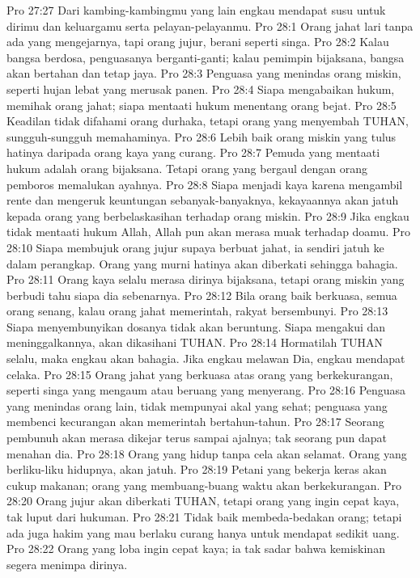 Pro 27:27  Dari kambing-kambingmu yang lain engkau mendapat susu untuk dirimu dan keluargamu serta pelayan-pelayanmu.
Pro 28:1  Orang jahat lari tanpa ada yang mengejarnya, tapi orang jujur, berani seperti singa.
Pro 28:2  Kalau bangsa berdosa, penguasanya berganti-ganti; kalau pemimpin bijaksana, bangsa akan bertahan dan tetap jaya.
Pro 28:3  Penguasa yang menindas orang miskin, seperti hujan lebat yang merusak panen.
Pro 28:4  Siapa mengabaikan hukum, memihak orang jahat; siapa mentaati hukum menentang orang bejat.
Pro 28:5  Keadilan tidak difahami orang durhaka, tetapi orang yang menyembah TUHAN, sungguh-sungguh memahaminya.
Pro 28:6  Lebih baik orang miskin yang tulus hatinya daripada orang kaya yang curang.
Pro 28:7  Pemuda yang mentaati hukum adalah orang bijaksana. Tetapi orang yang bergaul dengan orang pemboros memalukan ayahnya.
Pro 28:8  Siapa menjadi kaya karena mengambil rente dan mengeruk keuntungan sebanyak-banyaknya, kekayaannya akan jatuh kepada orang yang berbelaskasihan terhadap orang miskin.
Pro 28:9  Jika engkau tidak mentaati hukum Allah, Allah pun akan merasa muak terhadap doamu.
Pro 28:10  Siapa membujuk orang jujur supaya berbuat jahat, ia sendiri jatuh ke dalam perangkap. Orang yang murni hatinya akan diberkati sehingga bahagia.
Pro 28:11  Orang kaya selalu merasa dirinya bijaksana, tetapi orang miskin yang berbudi tahu siapa dia sebenarnya.
Pro 28:12  Bila orang baik berkuasa, semua orang senang, kalau orang jahat memerintah, rakyat bersembunyi.
Pro 28:13  Siapa menyembunyikan dosanya tidak akan beruntung. Siapa mengakui dan meninggalkannya, akan dikasihani TUHAN.
Pro 28:14  Hormatilah TUHAN selalu, maka engkau akan bahagia. Jika engkau melawan Dia, engkau mendapat celaka.
Pro 28:15  Orang jahat yang berkuasa atas orang yang berkekurangan, seperti singa yang mengaum atau beruang yang menyerang.
Pro 28:16  Penguasa yang menindas orang lain, tidak mempunyai akal yang sehat; penguasa yang membenci kecurangan akan memerintah bertahun-tahun.
Pro 28:17  Seorang pembunuh akan merasa dikejar terus sampai ajalnya; tak seorang pun dapat menahan dia.
Pro 28:18  Orang yang hidup tanpa cela akan selamat. Orang yang berliku-liku hidupnya, akan jatuh.
Pro 28:19  Petani yang bekerja keras akan cukup makanan; orang yang membuang-buang waktu akan berkekurangan.
Pro 28:20  Orang jujur akan diberkati TUHAN, tetapi orang yang ingin cepat kaya, tak luput dari hukuman.
Pro 28:21  Tidak baik membeda-bedakan orang; tetapi ada juga hakim yang mau berlaku curang hanya untuk mendapat sedikit uang.
Pro 28:22  Orang yang loba ingin cepat kaya; ia tak sadar bahwa kemiskinan segera menimpa dirinya.
